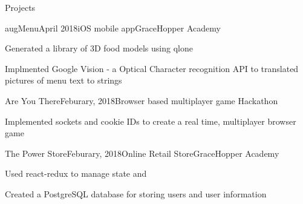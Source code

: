 \documentclass{resume} %
\begin{document}
    \begin{rSection}{Projects}
    \begin{rSubsection}{augMenu}{April 2018}{iOS mobile app}{GraceHopper Academy}
    \item Generated a library of 3D food models using qlone
    \item Implmented Google Vision - a Optical Character recognition API to translated pictures of menu text to strings 
    \end{rSubsection}
    \begin{rSubsection}{Are You There}{Feburary, 2018}{Browser based multiplayer game}{ Hackathon}
    \item Implemented sockets and cookie IDs to create a real time, multiplayer browser game
    \end{rSubsection}
    \begin{rSubsection}{The Power Store}{Feburary, 2018}{Online Retail Store}{GraceHopper Academy}
        \item Used react-redux to manage state and 
        \item Created a PostgreSQL database for storing users and user information
        \end{rSubsection}
    \end{rSection}
    
    
    
    
\end{document}
